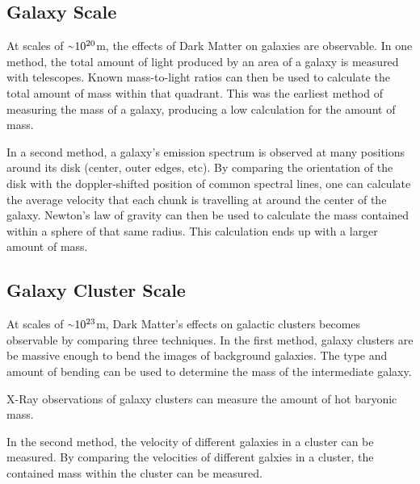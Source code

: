 \subsection{Galaxy Scale}
%
At scales of $\nicetilde 10^{20}$m, the effects of Dark Matter on galaxies are observable.
In one method, the total amount of light produced by an area of a galaxy is measured with telescopes.
Known mass-to-light ratios can then be used to calculate the total amount of mass within that quadrant.
This was the earliest method of measuring the mass of a galaxy, producing a low calculation for the amount of mass.

In a second method, a galaxy's emission spectrum is observed at many positions around its disk (center, outer edges, etc).
By comparing the orientation of the disk with the doppler-shifted position of common spectral lines, one can calculate the average velocity that each chunk is travelling at around the center of the galaxy.
Newton's law of gravity can then be used to calculate the mass contained within a sphere of that same radius.
This calculation ends up with a larger amount of mass.

\subsection{Galaxy Cluster Scale}
%
At scales of $\nicetilde 10^{23}$m, Dark Matter's effects on galactic clusters becomes observable by comparing three techniques.
In the first method, galaxy clusters are be massive enough to bend the images of background galaxies.
The type and amount of bending can be used to determine the mass of the intermediate galaxy.

X-Ray observations of galaxy clusters can measure the amount of hot baryonic mass.

In the second method, the velocity of different galaxies in a cluster can be measured.
By comparing the velocities of different galxies in a cluster, the contained mass within the cluster can be measured.



